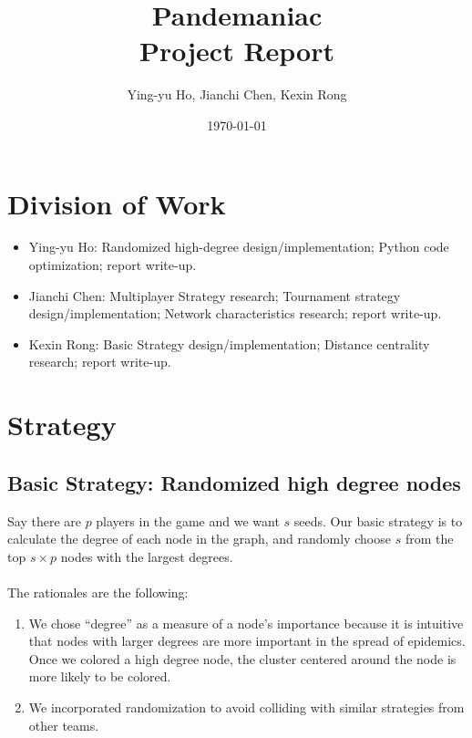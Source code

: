\documentclass[12pt]{article}
\newcommand{\course}[2]{\def\courseName{#1} \def\sectName{#2}}
\newcommand{\assn}[1]{\def\assnName{#1}}
\begin{document}
\course{Pandemaniac}{}
\assn{Project Report}
\date{\today}
\title{\courseName \sectName \\ \assnName}
\author{Ying-yu Ho, Jianchi Chen, Kexin Rong}
\maketitle

\thispagestyle{empty}
\section{Division of Work}
\begin{itemize}
\item Ying-yu Ho: Randomized high-degree design/implementation; Python code optimization; report write-up.
\item Jianchi Chen: Multiplayer Strategy research; Tournament strategy design/implementation; Network characteristics research; report write-up.
\item Kexin Rong: Basic Strategy design/implementation; Distance centrality research; report write-up.
\end{itemize}

\section{Strategy}
\subsection{Basic Strategy: Randomized high degree nodes}
Say there are $p$ players in the game and we want $s$ seeds. Our basic strategy is to calculate the degree of each node in the graph, and randomly choose $s$  from the top $s \times p$ nodes with the largest degrees. \\\\
The rationales are the following: 
\begin{enumerate}
\item We chose ``degree'' as a measure of a node's importance because it is intuitive that nodes with larger degrees are more important in the spread of epidemics. Once we colored a high degree node, the cluster centered around the node is more likely to be colored.
\item We incorporated randomization to avoid colliding with similar strategies from other teams. 
\end{enumerate}
\end{document}
